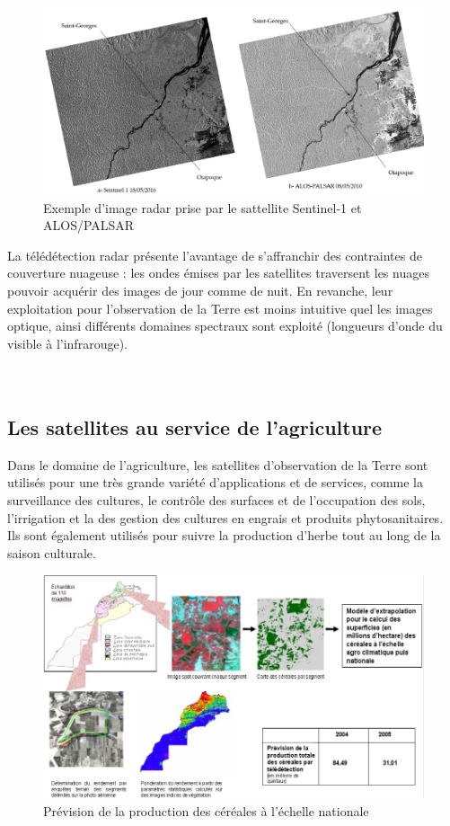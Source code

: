 \documentclass[12pt, openany]{report}
\begin{document}
\begin{figure}[h]
\centering
\includegraphics[scale=0.3]{image_radar.png}
\caption{Exemple d'image radar prise par le sattellite Sentinel-1 et ALOS/PALSAR}
\end{figure}

\par
La télédétection radar présente l’avantage de s’affranchir des contraintes de couverture nuageuse : les ondes émises par les satellites traversent les nuages pouvoir acquérir des images de jour comme de nuit. En revanche, leur exploitation pour l’observation de la Terre est moins intuitive quel les images optique, ainsi différents domaines spectraux sont exploité (longueurs d’onde du visible à l’infrarouge).\cite{ref4} \\ \\ \\



\subsection{Les satellites au service de l'agriculture}

Dans le domaine de l'agriculture, les satellites d'observation de la Terre sont utilisés pour une très grande variété d’applications et de services, comme la surveillance des cultures, le contrôle des surfaces et de l'occupation des sols, l'irrigation et la des gestion des cultures en engrais et produits phytosanitaires. Ils sont également utilisés pour suivre la production d'herbe tout au long de la saison culturale.  \cite{satt}


\begin{figure}[h]
\centering
\includegraphics[scale=0.65]{prev.jpg}
\caption{Prévision de la production des céréales à l'échelle nationale}
\end{figure}
\end{document}
